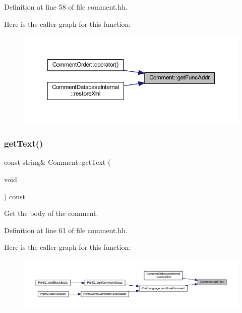 Definition at line 58 of file comment.\+hh.

Here is the caller graph for this function\+:
\nopagebreak
\begin{figure}[H]
\begin{center}
\leavevmode
\includegraphics[width=350pt]{class_comment_a0eccc5786c949590857ff8ed9e1dadbf_icgraph}
\end{center}
\end{figure}
\mbox{\label{class_comment_ad35a8f8b4ed02aaec090e6d912ffc47d}} 
\subsubsection{\texorpdfstring{getText()}{getText()}}
{\footnotesize\ttfamily const string\& Comment\+::get\+Text (\begin{DoxyParamCaption}\item[{void}]{ }\end{DoxyParamCaption}) const\hspace{0.3cm}{\ttfamily [inline]}}



Get the body of the comment. 



Definition at line 61 of file comment.\+hh.

Here is the caller graph for this function\+:
\nopagebreak
\begin{figure}[H]
\begin{center}
\leavevmode
\includegraphics[width=350pt]{class_comment_ad35a8f8b4ed02aaec090e6d912ffc47d_icgraph}
\end{center}
\end{figure}
\mbox{\label{class_comment_ab9f9f0db0645eef88a8259c34f414102}} 
